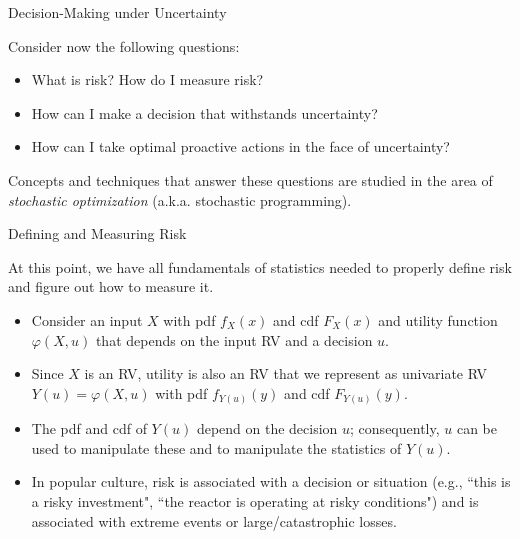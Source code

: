 \documentclass[handout,9pt]{beamer}
\begin{document}
%
\begin{frame}{Decision-Making under Uncertainty}

Consider now the following questions:

\begin{block}{}
\begin{itemize}
   \setlength{\itemsep}{10pt}
\item What is risk? How do I measure risk?
\item How can I make a decision that withstands uncertainty?
\item How can I take optimal proactive actions in the face of uncertainty?
\end{itemize}
\end{block}
Concepts and techniques that answer these questions are studied in the area of {\em stochastic optimization} (a.k.a. stochastic programming). 


\end{frame}

%
\begin{frame}{Defining and Measuring Risk}

At this point, we have all fundamentals of statistics needed to properly define risk and figure out how to measure it.

\begin{itemize}
   \setlength{\itemsep}{10pt}
\item Consider an input $X$ with pdf $f_X(x)$ and cdf $F_X(x)$ and utility function $\varphi(X,u)$ that depends on the input RV and a decision $u$. 

\item Since $X$ is an RV, utility is also an RV that we represent as univariate RV $Y(u)=\varphi(X,u)$ with pdf $f_{Y(u)}(y)$ and cdf $F_{Y(u)}(y)$. 

\item The pdf and cdf of $Y(u)$ depend on the decision $u$; consequently, $u$ can be used to manipulate these and to manipulate the statistics of $Y(u)$. 

\item In popular culture, risk is associated with a decision or situation (e.g., ``this is a risky investment", ``the reactor is operating at risky conditions") and is associated with extreme events or large/catastrophic losses.    

\end{itemize}

\end{frame}
\end{document}
